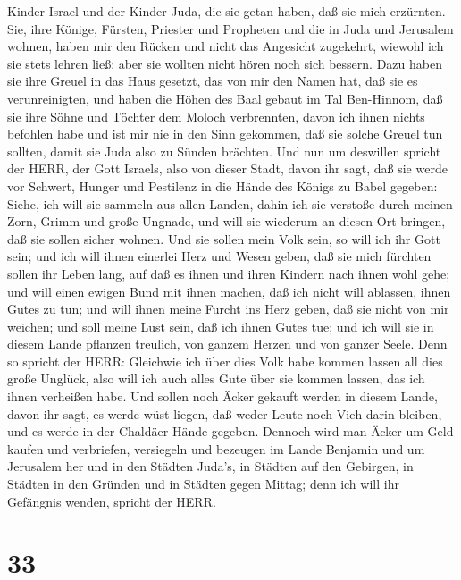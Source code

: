 Kinder Israel und der Kinder Juda, die sie getan haben, daß sie mich
erzürnten. Sie, ihre Könige, Fürsten, Priester und Propheten und die in
Juda und Jerusalem wohnen,  haben mir den Rücken und nicht
das Angesicht zugekehrt, wiewohl ich sie stets lehren ließ; aber sie
wollten nicht hören noch sich bessern.  Dazu haben sie ihre
Greuel in das Haus gesetzt, das von mir den Namen hat, daß sie es
verunreinigten,  und haben die Höhen des Baal gebaut im Tal
Ben-Hinnom, daß sie ihre Söhne und Töchter dem Moloch verbrennten, davon
ich ihnen nichts befohlen habe und ist mir nie in den Sinn gekommen, daß
sie solche Greuel tun sollten, damit sie Juda also zu Sünden brächten.
 Und nun um deswillen spricht der HERR, der Gott Israels,
also von dieser Stadt, davon ihr sagt, daß sie werde vor Schwert, Hunger
und Pestilenz in die Hände des Königs zu Babel gegeben: 
Siehe, ich will sie sammeln aus allen Landen, dahin ich sie verstoße
durch meinen Zorn, Grimm und große Ungnade, und will sie wiederum an
diesen Ort bringen, daß sie sollen sicher wohnen.  Und sie
sollen mein Volk sein, so will ich ihr Gott sein;  und ich
will ihnen einerlei Herz und Wesen geben, daß sie mich fürchten sollen
ihr Leben lang, auf daß es ihnen und ihren Kindern nach ihnen wohl gehe;
 und will einen ewigen Bund mit ihnen machen, daß ich nicht
will ablassen, ihnen Gutes zu tun; und will ihnen meine Furcht ins Herz
geben, daß sie nicht von mir weichen;  und soll meine Lust
sein, daß ich ihnen Gutes tue; und ich will sie in diesem Lande pflanzen
treulich, von ganzem Herzen und von ganzer Seele.  Denn so
spricht der HERR: Gleichwie ich über dies Volk habe kommen lassen all
dies große Unglück, also will ich auch alles Gute über sie kommen
lassen, das ich ihnen verheißen habe.  Und sollen noch
Äcker gekauft werden in diesem Lande, davon ihr sagt, es werde wüst
liegen, daß weder Leute noch Vieh darin bleiben, und es werde in der
Chaldäer Hände gegeben.  Dennoch wird man Äcker um Geld
kaufen und verbriefen, versiegeln und bezeugen im Lande Benjamin und um
Jerusalem her und in den Städten Juda's, in Städten auf den Gebirgen, in
Städten in den Gründen und in Städten gegen Mittag; denn ich will ihr
Gefängnis wenden, spricht der HERR.

\hypertarget{section-32}{%
\section{33}\label{section-32}}

